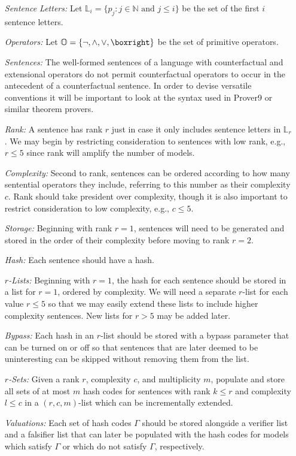 \documentclass[a4paper, 11pt]{article} %
\newcommand{\set}[1]{\lbrace#1\rbrace} %
\renewcommand{\L}[0]{\mathbb{L}}
\newcommand{\N}[0]{\mathbb{N}}
\renewcommand{\O}[0]{\mathbb{O}}
\begin{document}
\begin{enumerate}
  \item[\it Sentence Letters:] Let $\L_i=\set{p_j:j\in\N \text{ and } j\leq i}$ be the set of the first $i$ sentence letters. 
  \item[\it Operators:] Let $\O=\set{\neg,\wedge,\vee,\boxright}$ be the set of primitive operators. 
  \item[\it Sentences:] The well-formed sentences of a language with counterfactual and extensional operators do not permit counterfactual operators to occur in the antecedent of a counterfactual sentence. In order to devise versatile conventions it will be important to look at the syntax used in Prover9 or similar theorem provers.
  \item[\it Rank:] A sentence has rank $r$ just in case it only includes sentence letters in $\L_r$. We may begin by restricting consideration to sentences with low rank, e.g., $r\leq5$ since rank will amplify the number of models.
  \item[\it Complexity:] Second to rank, sentences can be ordered according to how many sentential operators they include, referring to this number as their complexity $c$. Rank should take president over complexity, though it is also important to restrict consideration to low complexity, e.g., $c\leq5$.
  \item[\it Storage:] Beginning with rank $r=1$, sentences will need to be generated and stored in the order of their complexity before moving to rank $r=2$.
  \item[\it Hash:] Each sentence should have a hash.
  \item[\it $r$-Lists:] Beginning with $r=1$, the hash for each sentence should be stored in a list for $r=1$, ordered by complexity. We will need a separate $r$-list for each value $r\leq 5$ so that we may easily extend these lists to include higher complexity sentences. New lists for $r>5$ may be added later. 
  \item[\it Bypass:] Each hash in an $r$-list should be stored with a bypass parameter that can be turned on or off so that sentences that are later deemed to be uninteresting can be skipped without removing them from the list.
  \item[\it $r$-Sets:] Given a rank $r$, complexity $c$, and multiplicity $m$, populate and store all sets of at most $m$ hash codes for sentences with rank $k\leq r$ and complexity $l\leq c$ in a $(r,c,m)$-list which can be incrementally extended. 
  \item[\it Valuations:] Each set of hash codes $\Gamma$ should be stored alongside a verifier list and a falsifier list that can later be populated with the hash codes for models which satisfy $\Gamma$ or which do not satisfy $\Gamma$, respectively. 

\end{enumerate}
\end{document}
